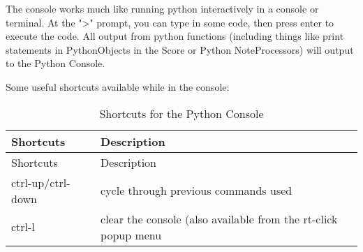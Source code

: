 The console works much like running python interactively in a console or
terminal. At the "\textgreater{}" prompt, you can type in some code,
then press enter to execute the code. All output from python functions
(including things like print statements in PythonObjects in the Score or
Python NoteProcessors) will output to the Python Console.

Some useful shortcuts available while in the console:

\begin{longtable}[]{@{}ll@{}}
\caption{Shortcuts for the Python Console}\tabularnewline
\toprule
Shortcuts & Description\tabularnewline
\midrule
\endfirsthead
\toprule
Shortcuts & Description\tabularnewline
\midrule
\endhead
ctrl-up/ctrl-down & cycle through previous commands used\tabularnewline
ctrl-l & clear the console (also available from the rt-click popup
menu\tabularnewline
\bottomrule
\end{longtable}
